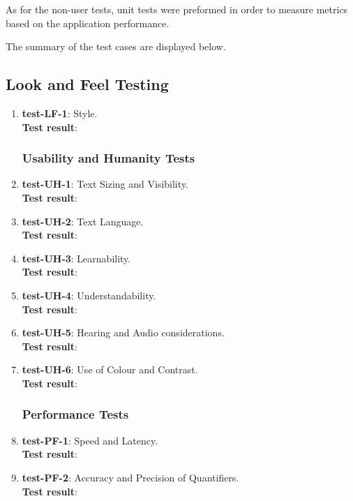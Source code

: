 \documentclass[12pt, titlepage]{article}
\begin{document}
\noindent As for the non-user tests, unit tests were preformed in order to measure metrics based on the application performance.

\noindent The summary of the test cases are displayed below.

\subsection{Look and Feel Testing}
\begin{enumerate}
	\item{\textbf{test-LF-1}}: Style.\\
	\textbf{Test result}:
	
\subsubsection{Usability and Humanity Tests}
	\item{\textbf{test-UH-1}}: Text Sizing and Visibility.\\
	\textbf{Test result}:
	
	\item{\textbf{test-UH-2}}: Text Language.\\
	\textbf{Test result}:
	
	\item{\textbf{test-UH-3}}: Learnability.\\
	\textbf{Test result}:
	
	\item{\textbf{test-UH-4}}: Understandability.\\
	\textbf{Test result}:
	
	\item{\textbf{test-UH-5}}: Hearing and Audio considerations.\\
	\textbf{Test result}:
	
	\item{\textbf{test-UH-6}}: Use of Colour and Contrast.\\
	\textbf{Test result}:
	
\subsubsection{Performance Tests}
	\item{\textbf{test-PF-1}}: Speed and Latency.\\
	\textbf{Test result}:
	
	\item{\textbf{test-PF-2}}: Accuracy and Precision of Quantifiers.\\
	\textbf{Test result}:
	

\end{enumerate}
\end{document}
